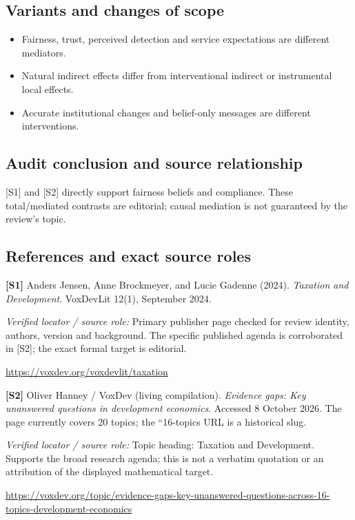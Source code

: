 \documentclass[11pt,a4paper]{article}
\begin{document}
\subsection*{Variants and changes of scope}

\begin{itemize}
\item Fairness, trust, perceived detection and service expectations are different mediators.
\item Natural indirect effects differ from interventional indirect or instrumental local effects.
\item Accurate institutional changes and belief-only messages are different interventions.
\end{itemize}

\subsection*{Audit conclusion and source relationship}

[S1] and [S2] directly support fairness beliefs and compliance. These total/mediated contrasts are editorial; causal mediation is not guaranteed by the review's topic.

\subsection*{References and exact source roles}

{\footnotesize\raggedright
\par\noindent\textbf{[S1]} Anders Jensen, Anne Brockmeyer, and Lucie Gadenne (2024). \emph{Taxation and Development}. VoxDevLit 12(1), September 2024.\par \textit{Verified locator / source role:} Primary publisher page checked for review identity, authors, version and background. The specific published agenda is corroborated in [S2]; the exact formal target is editorial.\par \url{https://voxdev.org/voxdevlit/taxation}\par\smallskip
\par\noindent\textbf{[S2]} Oliver Hanney / VoxDev (living compilation). \emph{Evidence gaps: Key unanswered questions in development economics}. Accessed 8 October 2026. The page currently covers 20 topics; the ``16-topics URL is a historical slug.\par \textit{Verified locator / source role:} Topic heading: Taxation and Development. Supports the broad research agenda; this is not a verbatim quotation or an attribution of the displayed mathematical target.\par \url{https://voxdev.org/topic/evidence-gaps-key-unanswered-questions-across-16-topics-development-economics}\par\smallskip
}
\end{document}
